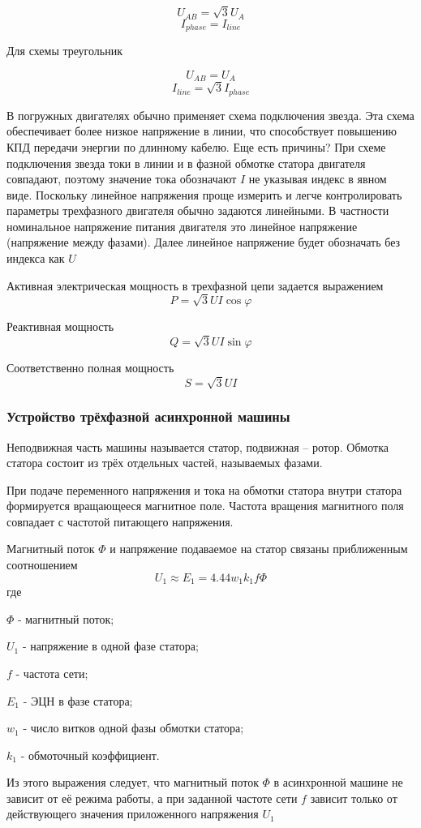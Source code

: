$$ U_{AB} = \sqrt{3} U_{A} $$
$$ I_{phase} = I_{line} $$

Для схемы треугольник 

$$ U_{AB} =  U_{A} $$
$$ I_{line} =\sqrt{3} I_{phase} $$


В погружных двигателях обычно применяет схема подключения звезда. Эта схема обеспечивает более низкое напряжение в линии, что способствует повышению КПД передачи энергии по длинному кабелю. Еще есть причины?
При схеме подключения звезда токи в линии и в фазной обмотке статора двигателя совпадают, поэтому значение тока обозначают $I$ не указывая индекс в явном виде. Поскольку линейное напряжения проще измерить и легче контролировать параметры трехфазного двигателя обычно задаются линейными. В частности номинальное напряжение питания двигателя это линейное напряжение (напряжение между фазами). Далее линейное напряжение будет обозначать без индекса как $U$

Активная электрическая мощность в трехфазной цепи задается выражением 
$$ P= \sqrt{3}U I \cos \varphi$$

Реактивная мощность 
$$ Q= \sqrt{3}U I \sin \varphi$$

Соответственно полная мощность 
$$ S= \sqrt{3}U I $$

\subsubsection{ Устройство трёхфазной асинхронной машины}
Неподвижная часть машины называется статор, подвижная – ротор. Обмотка статора состоит из трёх отдельных частей, называемых фазами.

При подаче переменного напряжения и тока на обмотки статора внутри статора формируется вращающееся магнитное поле. Частота вращения магнитного поля совпадает с частотой питающего напряжения. 

Магнитный поток $\Phi $ и напряжение подаваемое на статор связаны приближенным соотношением 
$$ U_1 \approx E_1 = 4.44 w_1 k_1 f \Phi $$
где 

 $\Phi$ -  магнитный поток;
 
 $U_1$ -	напряжение в одной фазе статора;
 
 $f$   - частота сети;
 
 $E_1$	- ЭЦН в фазе статора;
 
 $w_1$ - число витков одной фазы обмотки статора;
 
 $k_1$  - обмоточный коэффициент.
   
Из этого выражения следует, что магнитный поток $\Phi $ в асинхронной машине не зависит от её режима работы, а при заданной частоте сети $f$ зависит только от действующего значения приложенного напряжения $U_1$


